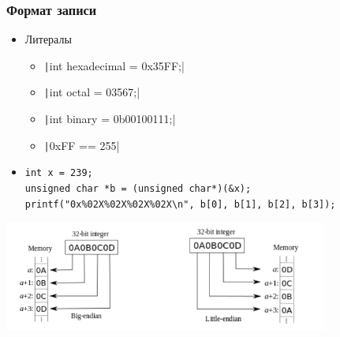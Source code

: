 \documentclass[xetex,mathserif,serif]{beamer}
\begin{document}
	\begin{frame}[fragile]
		\frametitle{Формат записи}
		\begin{itemize}
			\item Литералы
			\begin{itemize}
				\item \texttt|int hexadecimal = 0x35FF;|
				\item \texttt|int octal = 03567;|
				\item \texttt|int binary = 0b00100111;|
				\item \texttt|0xFF == 255|
			\end{itemize}
			\item 
			\begin{footnotesize}
				\begin{verbatim}
int x = 239;
unsigned char *b = (unsigned char*)(&x);
printf("0x%02X%02X%02X%02X\n", b[0], b[1], b[2], b[3]);
				\end{verbatim}
			\end{footnotesize}
		\end{itemize}
		\begin{center}
			\includegraphics[width=0.8\textwidth]{little-endian-big-endian.png}
		\end{center}
	\end{frame}
\end{document}
